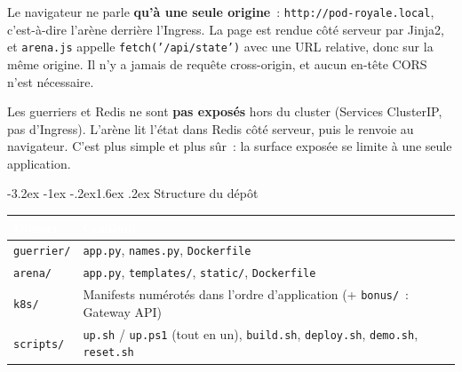 \documentclass[11pt,a4paper]{article}
\makeatletter
\newcommand{\titlefont}{\sffamily\bfseries}
\renewcommand\section{\@startsection{section}{1}{\z@}%
  {-3.2ex \@plus -1ex \@minus -.2ex}{1.6ex \@plus .2ex}%
  {\titlefont\Large\color{nuit}}}
\newcommand{\code}[1]{\texttt{#1}}
\newcommand{\entete}[1]{\textcolor{white}{\sffamily\bfseries #1}}
\makeatother
\begin{document}
Le navigateur ne parle \textbf{qu'à une seule origine}~:
\code{http://pod-royale.local}, c'est-à-dire l'arène derrière l'Ingress. La page
est rendue côté serveur par Jinja2, et \code{arena.js} appelle
\code{fetch('/api/state')} avec une URL relative, donc sur la même origine. Il
n'y a jamais de requête cross-origin, et aucun en-tête CORS n'est nécessaire.

Les guerriers et Redis ne sont \textbf{pas exposés} hors du cluster (Services
ClusterIP, pas d'Ingress). L'arène lit l'état dans Redis côté serveur, puis le
renvoie au navigateur. C'est plus simple et plus sûr~: la surface exposée se
limite à une seule application.

\clearpage
\section{Structure du dépôt}

\begin{longtable}{L{2.3cm} L{13.2cm}}
\entete{Dossier} & \entete{Contenu}\\
\endhead
{}\code{guerrier/} & \code{app.py}, \code{names.py}, \code{Dockerfile}\\
\code{arena/} & \code{app.py}, \code{templates/}, \code{static/}, \code{Dockerfile}\\
\code{k8s/} & Manifests numérotés dans l'ordre d'application
  (+ \code{bonus/}~: Gateway API)\\
\code{scripts/} & \code{up.sh} / \code{up.ps1} (tout en un), \code{build.sh},
  \code{deploy.sh}, \code{demo.sh}, \code{reset.sh}\\
\bottomrule
\end{longtable}
\end{document}
